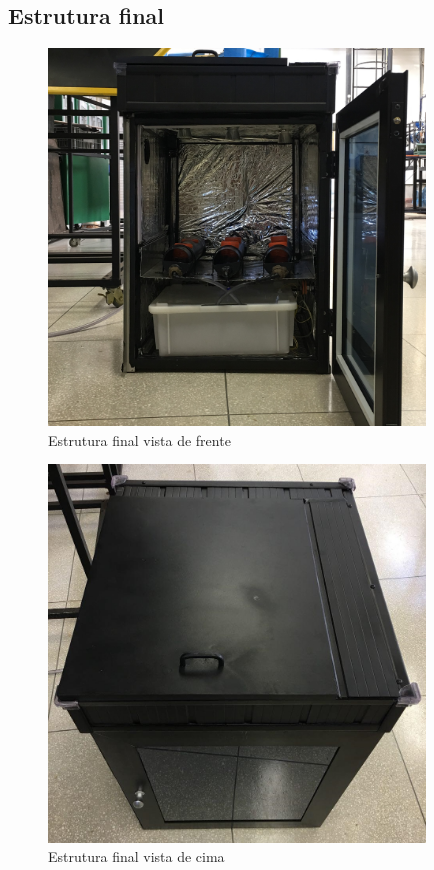 \subsection{Estrutura final}
\begin{figure}[H]
	\centering
	\includegraphics[width=10cm]{figuras/estufapreta_frente.JPG}
	\caption{Estrutura final vista de frente}
	\label{fig:estufapreta_frente}
\end{figure}
\begin{figure}[H]
	\centering
	\includegraphics[width=10cm]{figuras/estufapreta_cima.jpg}
	\caption{Estrutura final vista de cima}
	\label{fig:estufapreta_cima}
\end{figure}
